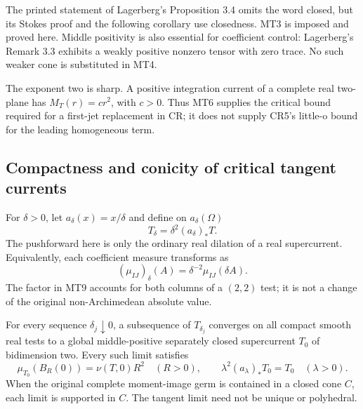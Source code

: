 The printed statement of Lagerberg's Proposition 3.4
omits the word closed, but its Stokes proof and the
following corollary use closedness.  MT3 is imposed
and proved here.  Middle positivity is also essential
for coefficient control: Lagerberg's Remark 3.3
exhibits a weakly positive nonzero tensor with zero
trace.  No such weaker cone is substituted in MT4.

The exponent two is sharp.  A positive integration
current of a complete real two-plane has
\(M_T(r)=c r^2\), with \(c>0\).  Thus MT6
supplies the critical bound required for a first-jet
replacement in CR; it does not supply CR5's little-o
bound for the leading homogeneous term.

\subsection{Compactness and conicity of critical tangent currents}

For \(\delta>0\), let \(a_\delta(x)=x/\delta\)
and define on \(a_\delta(\Omega)\)
\[
                  T_\delta=\delta^2(a_\delta)_*T.
\tag{MT9}
\]
The pushforward here is only the ordinary real dilation
of a real supercurrent.  Equivalently, each coefficient
measure transforms as
\[
                    (\mu_{IJ})_\delta(A)
                                =\delta^{-2}\mu_{IJ}(\delta A).
\tag{MT10}
\]
The factor in MT9 accounts for both columns of a
\((2,2)\) test; it is not a change of the original
non-Archimedean absolute value.

\begin{corollary}
\label{cor:r13-critical-tangent-current-compactness}
For every sequence \(\delta_j\downarrow0\), a subsequence
of \(T_{\delta_j}\) converges on all compact smooth
real tests to a global middle-positive separately
closed supercurrent \(T_0\) of bidimension two.
Every such limit satisfies
\[
       \mu_{T_0}(B_R(0))=\nu(T,0)R^2\quad(R>0),
       \qquad \lambda^2(a_\lambda)_*T_0=T_0
                                      \quad(\lambda>0).
\tag{MT11}
\]
When the original complete moment-image germ is contained
in a closed cone \(C\), each limit is supported in \(C\).
The tangent limit need not be unique or polyhedral.
\end{corollary}

